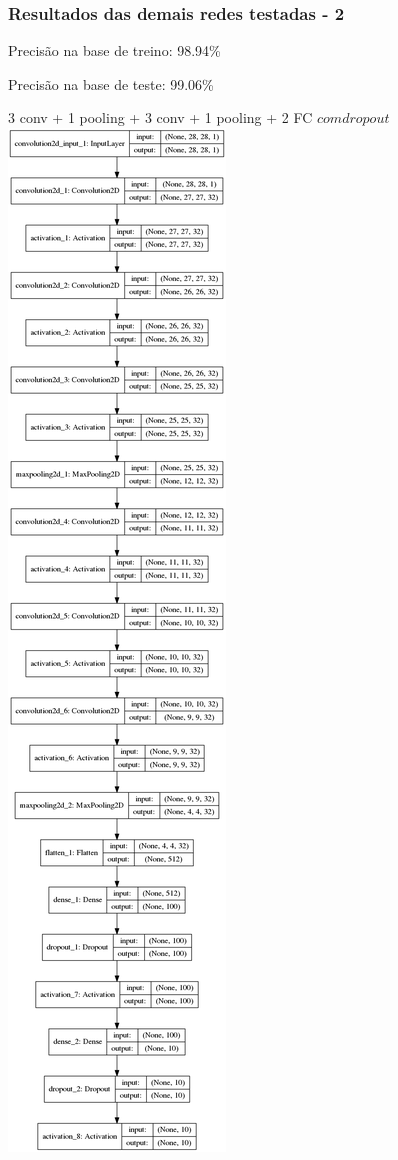 \documentclass[tikz,10pt]{beamer}
\begin{document}
\begin{frame}
	\frametitle{Resultados das demais redes testadas - 2 }
	\centering
	\par Precisão na base de treino: 98.94\%
	\par Precisão na base de teste: 99.06\%
	\par 3 conv + 1 pooling + 3 conv + 1 pooling + 2 FC \(com dropout\)
	\\
	\includegraphics[height=.7\paperheight]{images/resultados/network_2/model}
\end{frame}
\end{document}
